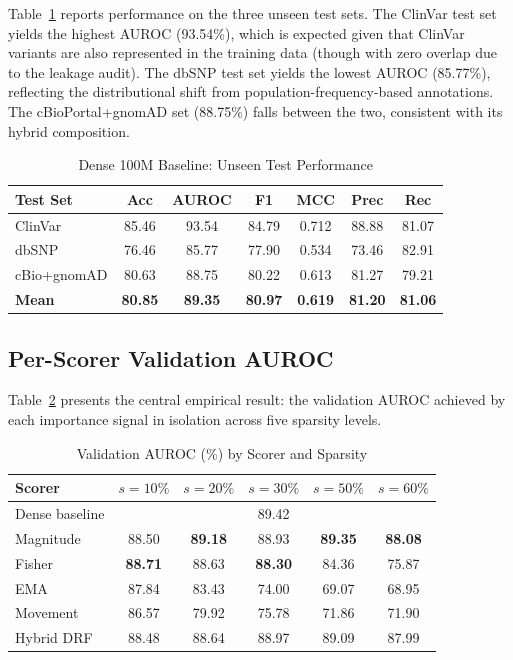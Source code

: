 \documentclass[journal]{IEEEtran}
\newcommand{\spars}[1]{$s{=}#1\%$}
\begin{document}
Table~\ref{tab:dense_test} reports performance on the three
unseen test sets.
The ClinVar test set yields the highest AUROC (93.54\%),
which is expected given that ClinVar variants are also
represented in the training data (though with zero overlap
due to the leakage audit).
The dbSNP test set yields the lowest AUROC (85.77\%),
reflecting the distributional shift from population-frequency-based
annotations.
The cBioPortal+gnomAD set (88.75\%) falls between the two,
consistent with its hybrid composition.

\begin{table}[!t]
\centering
\caption{Dense 100M Baseline: Unseen Test Performance}
\label{tab:dense_test}
\renewcommand{\arraystretch}{1.2}
\begin{tabular}{@{}lcccccc@{}}
\toprule
\textbf{Test Set} & \textbf{Acc} & \textbf{AUROC} &
\textbf{F1} & \textbf{MCC} & \textbf{Prec} & \textbf{Rec} \\
\midrule
ClinVar    & 85.46 & 93.54 & 84.79 & 0.712 & 88.88 & 81.07 \\
dbSNP      & 76.46 & 85.77 & 77.90 & 0.534 & 73.46 & 82.91 \\
cBio+gnomAD & 80.63 & 88.75 & 80.22 & 0.613 & 81.27 & 79.21 \\
\midrule
\textbf{Mean} & \textbf{80.85} & \textbf{89.35} &
\textbf{80.97} & \textbf{0.619} & \textbf{81.20} & \textbf{81.06} \\
\bottomrule
\end{tabular}
\end{table}

\subsection{Per-Scorer Validation AUROC}

Table~\ref{tab:scorer_auroc} presents the central empirical
result: the validation AUROC achieved by each importance
signal in isolation across five sparsity levels.

\begin{table}[!t]
\centering
\caption{Validation AUROC (\%) by Scorer and Sparsity}
\label{tab:scorer_auroc}
\renewcommand{\arraystretch}{1.2}
\begin{tabular}{@{}lccccc@{}}
\toprule
\textbf{Scorer} & \spars{10} & \spars{20} & \spars{30} &
\spars{50} & \spars{60} \\
\midrule
Dense baseline & \multicolumn{5}{c}{89.42} \\
\midrule
Magnitude & 88.50 & \textbf{89.18} & 88.93 & \textbf{89.35} & \textbf{88.08} \\
Fisher    & \textbf{88.71} & 88.63 & \textbf{88.30} & 84.36 & 75.87 \\
EMA       & 87.84 & 83.43 & 74.00 & 69.07 & 68.95 \\
Movement  & 86.57 & 79.92 & 75.78 & 71.86 & 71.90 \\
\midrule
Hybrid DRF & 88.48 & 88.64 & 88.97 & 89.09 & 87.99 \\
\bottomrule
\end{tabular}
\end{table}
\end{document}
